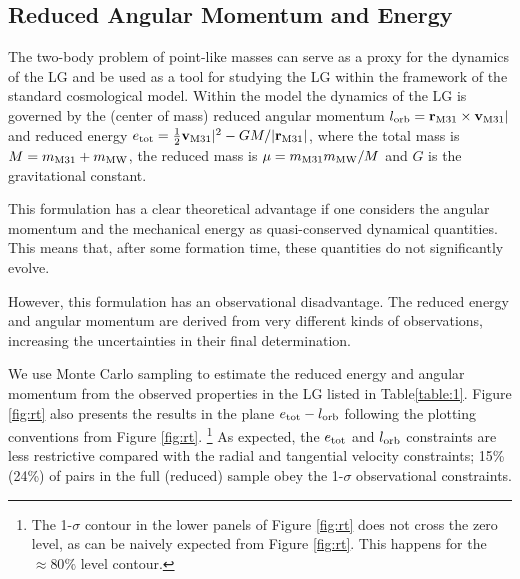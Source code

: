 \documentclass{emulateapj}
\begin{document}
\subsection{Reduced Angular Momentum and Energy}
\label{subsection:e-l}



The two-body problem of point-like masses can serve as a proxy for the
dynamics of the LG and be used as a tool for  studying the LG within
the framework of the standard cosmological model. Within the model the
dynamics of the LG is governed by the (center of mass)  reduced
angular momentum $l_{\rm orb}= {{\bf r}_{\rm M31}}\times{\bf v}_{\rm M31}|$ and
reduced energy  $e_{\rm tot}=\frac{1}{2} {\bf v}_{\rm M31}|^2 - G M/|{\bf
  r}_{\rm M31}|$,  where the total mass is $M=m_{\rm M31}+m_{\rm MW}$,
the reduced mass is $\mu=m_{\rm M31}m_{\rm MW}/M$ and $G$ is the
gravitational constant.  


This formulation has a clear theoretical advantage if one considers
the angular momentum and the mechanical energy as quasi-conserved
dynamical quantities. This means that, after some formation time,
these quantities do not significantly evolve.


However, this formulation has an observational disadvantage. The
reduced energy and angular momentum are derived from very different
kinds of observations, increasing the uncertainties in their final
determination.  

We use Monte Carlo sampling to estimate the reduced energy and angular
momentum from the observed properties in the LG listed in
Table\ref{table:1}. Figure \ref{fig:rt} also presents the results in the
plane $e_{\rm tot}-l_{\rm orb}$ following the   plotting conventions from
Figure \ref{fig:rt}. \footnote{The  1-$\sigma$ contour in the lower
  panels of Figure \ref{fig:rt}
does not cross the zero level, as can be naively expected from Figure
\ref{fig:rt}. This happens for the $\approx 80\%$ level
contour.}  As expected, the $e_{\rm tot}$  and $l_{\rm orb}$
constraints are less restrictive compared with the radial and
tangential velocity constraints; 15\% (24\%) of pairs in the full
(reduced) sample obey the 1-$\sigma$ observational constraints.  
\end{document}

